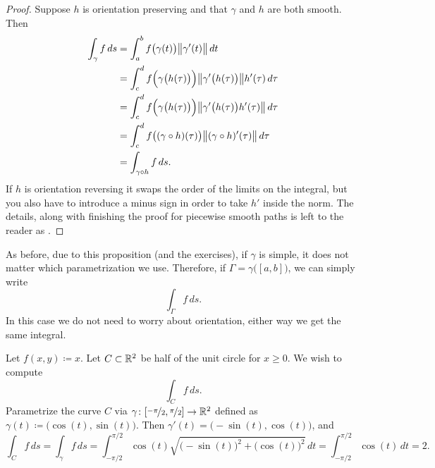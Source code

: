 \begin{proof}
Suppose $h$ is orientation preserving and that $\gamma$ and $h$
are both smooth.  Then 
\begin{equation*}
\begin{split}
\int_{\gamma} f \, ds
& =
\int_a^b 
f\bigl(\gamma(t)\bigr) \bigl\lVert {\gamma'(t)} \bigr\rVert \, dt
\\
& =
\int_c^d 
f\Bigl(\gamma\bigl(h(\tau)\bigr)\Bigr)
\bigl\lVert {\gamma'\bigl(h(\tau)\bigr)} \bigr\rVert h'(\tau) \, d\tau
\\
& =
\int_c^d 
f\Bigl(\gamma\bigl(h(\tau)\bigr)\Bigr)
\bigl\lVert {\gamma'\bigl(h(\tau)\bigr) h'(\tau)} \bigr\rVert \, d\tau
\\
& =
\int_c^d 
f\bigl((\gamma \circ h)(\tau)\bigr) \bigl\lVert {(\gamma \circ h)'(\tau)} \bigr\rVert \, d\tau
\\
& = 
\int_{\gamma \circ h} f \, ds .
\end{split}
\end{equation*}
If $h$ is orientation reversing it swaps the order of the limits on the
integral, but you also have to introduce a minus sign in order
to take $h'$ inside the norm.
The details, along with finishing the proof for piecewise smooth
paths is left to the reader as .
\end{proof}

As before,
due to this proposition (and the exercises),
if $\gamma$ is simple, it does not matter which
parametrization we use.  Therefore, if $\Gamma = \gamma\bigl( [a,b] \bigr)$, we can
simply write
\begin{equation*}
\int_\Gamma f\, ds .
\end{equation*}
In this case we do not need to worry about orientation, either way we
get the same integral.

\begin{example}
Let $f(x,y) \coloneqq x$.  Let $C \subset {\mathbb{R}}^2$ be half of the unit circle for $x
\geq 0$.  We wish to compute
\begin{equation*}
\int_C f \, ds .
\end{equation*}
Parametrize the curve $C$ via $\gamma \colon
[\nicefrac{-\pi}{2},\nicefrac{\pi}{2}] \to {\mathbb{R}}^2$ defined as
$\gamma(t) \coloneqq \bigl(\cos(t),\sin(t)\bigr)$.
Then $\gamma'(t) = \bigl(-\sin(t),\cos(t)\bigr)$, and
\begin{equation*}
\int_C f \, ds =
\int_\gamma f \, ds
=
\int_{-\pi/2}^{\pi/2} \cos(t) \sqrt{ {\bigl(-\sin(t)\bigr)}^2 +  
{\bigl(\cos(t)\bigr)}^2 } \, dt
=
\int_{-\pi/2}^{\pi/2} \cos(t) \, dt = 2.
\end{equation*}
\end{example}


